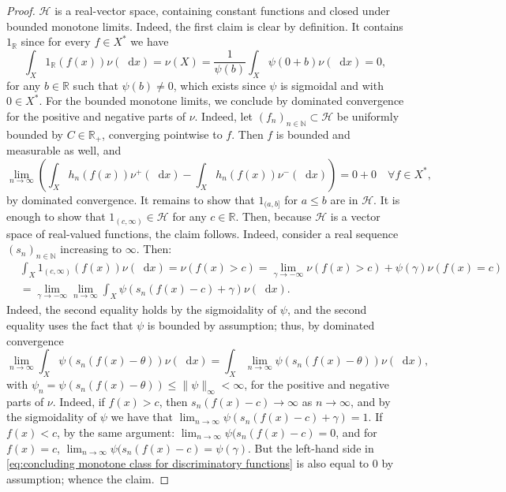 \documentclass[11pt,a4paper,twoside,openany]{report}
\newcommand{\diff}{\mathop{}\!\mathrm{d}}
\theoremstyle{plain} %
\theoremstyle{definition} %
\theoremstyle{remark} %
\begin{document}
\begin{proof}
    \(\mathcal{H}\) is a real-vector space, containing constant functions and closed under  bounded monotone limits. Indeed, the first claim is clear by definition. It contains \(1_{\mathbb{R}}\) since for every \(f\in X^*\) we have 
    \begin{equation}
        \int_X1_{\mathbb{R}}(f(x))\nu(\diff x)=\nu(X)=\frac{1}{\psi(b)}\int_X\psi(0+b)\nu(\diff x)=0,
    \end{equation}
    for any \(b\in\mathbb{R}\) such that \(\psi(b)\neq 0\), which exists since \(\psi\) is sigmoidal and with \(0\in X^*\).
    For the bounded monotone limits, we conclude by dominated convergence for the positive and negative parts of \(\nu\). Indeed, let \((f_n)_{n\in\mathbb{N}}\subset \mathcal{H}\) be uniformly bounded by \(C\in\mathbb{R}_+\), converging pointwise to \(f\). Then \(f\) is bounded and measurable as well, and 
    \begin{equation}
        \lim_{n\to\infty}\left(\int_Xh_n(f(x))\nu^+(\diff x)-\int_Xh_n(f(x))\nu^-(\diff x)\right)=0+0\quad\forall f\in X^*,
    \end{equation}
    by dominated convergence. It remains to show that \(1_{(a,b]}\) for \(a\leq b\) are in \(\mathcal{H}\). It is enough to show that \(1_{(c,\infty)}\in\mathcal{H}\) for any \(c\in\mathbb{R}\). Then, because \(\mathcal{H}\) is a vector space of real-valued functions, the claim follows. Indeed, consider a real sequence \((s_n)_{n\in\mathbb{N}}\) increasing to \(\infty\). Then:
    \begin{align}\label{eq:concluding monotone class for discriminatory functions}
        &\int_X1_{(c,\infty)}(f(x))\nu(\diff x)=\nu(f(x)>c)=\lim_{\gamma\to-\infty}\nu(f(x)>c)+\psi(\gamma)\nu(f(x)=c)\\&=\lim_{\gamma\to-\infty}\lim_{n\to\infty}\int_X\psi(s_n(f(x)-c)+\gamma)\nu(\diff x).
    \end{align}
    Indeed, the second equality holds by the sigmoidality of \(\psi\), and the second equality uses the fact that \(\psi\) is bounded by assumption; thus, by dominated convergence 
    \begin{equation}
        \lim_{n\to\infty}\int_X\psi(s_n(f(x)-\theta))\nu(\diff x)=\int_X\lim_{n\to\infty}\psi(s_n(f(x)-\theta))\nu(\diff x),
        \end{equation}
        with \(\psi_n=\psi(s_n(f(x)-\theta))\leq\lVert \psi\rVert_{\infty}<\infty\),  for the positive and negative parts of \(\nu\). Indeed, if \(f(x)>c\), then \(s_n(f(x)-c)\to\infty\) as \(n\to\infty\), and by the sigmoidality of \(\psi\) we have that \(\lim_{n\to\infty}\psi(s_n(f(x)-c)+\gamma)=1\). If \(f(x)<c\), by the same argument: \(\lim_{n\to\infty}\psi(s_n(f(x)-c)=0\), and for \(f(x)=c\), \(\lim_{n\to\infty}\psi(s_n(f(x)-c)=\psi(\gamma)\). But the left-hand side in \cref{eq:concluding monotone class for discriminatory functions} is also equal to \(0\) by assumption; whence the claim.
\end{proof}
\end{document}
